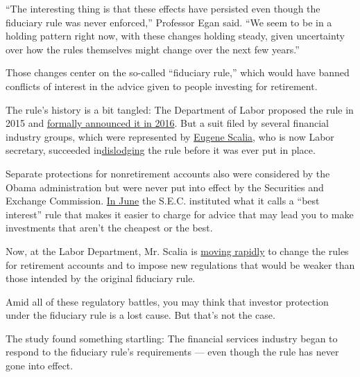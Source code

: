 ``The interesting thing is that these effects have persisted even though
the fiduciary rule was never enforced,'' Professor Egan said. ``We seem
to be in a holding pattern right now, with these changes holding steady,
given uncertainty over how the rules themselves might change over the
next few years.''

Those changes center on the so-called ``fiduciary rule,'' which would
have banned conflicts of interest in the advice given to people
investing for retirement.

The rule's history is a bit tangled: The Department of Labor proposed
the rule in 2015 and
\href{https://www.nytimes3xbfgragh.onion/2016/04/07/your-money/new-rules-for-retirement-accounts-financial-advisers.html}{formally
announced it in 2016}. But a suit filed by several financial industry
groups, which were represented by
\href{https://www.nytimes3xbfgragh.onion/2020/08/21/business/labor-department-proposal-retirement-planning.html}{Eugene
Scalia}, who is now Labor secretary, succeeded
in\href{https://www.nytimes3xbfgragh.onion/2018/06/22/your-money/fiduciary-rule-dies.html}{dislodging}
the rule before it was ever put in place.

Separate protections for nonretirement accounts also were considered by
the Obama administration but were never put into effect by the
Securities and Exchange Commission.
\href{https://www.nytimes3xbfgragh.onion/2020/07/16/your-money/fiduciary-duty-investments-best-interest.html\#:~:text=A\%20Securities\%20and\%20Exchange\%20Commission\%20rule\%20that\%20took\%20effect\%20on,protections\%20than\%20the\%20rule\%20delivers.}{In
June} the S.E.C. instituted what it calls a ``best interest'' rule that
makes it easier to charge for advice that may lead you to make
investments that aren't the cheapest or the best.

Now, at the Labor Department, Mr. Scalia is
\href{https://www.nytimes3xbfgragh.onion/2020/08/21/business/labor-department-proposal-retirement-planning.html}{moving
rapidly} to change the rules for retirement accounts and to impose new
regulations that would be weaker than those intended by the original
fiduciary rule.

Amid all of these regulatory battles, you may think that investor
protection under the fiduciary rule is a lost cause. But that's not the
case.

The study found something startling: The financial services industry
began to respond to the fiduciary rule's requirements --- even though
the rule has never gone into effect.

